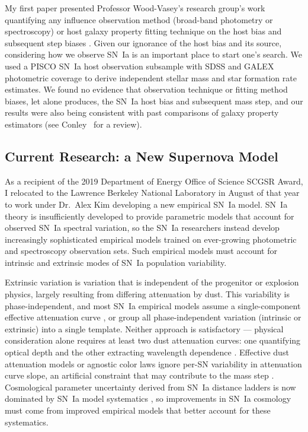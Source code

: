 \documentclass[modern]{aastex631}
\begin{document}
My first paper presented Professor Wood-Vasey's research group's work quantifying any influence observation method (broad-band photometry or spectroscopy) or host galaxy property fitting technique on the host bias and subsequent step biases \citep{Hand2022}. 
Given our ignorance of the host bias and its source, considering how we observe SN~Ia is an important place to start one's search. 
We used a PISCO SN~Ia host observation subsample \citep{Galbany2018} with SDSS and GALEX photometric coverage \citep{Alam2018,Morrissey2007} to derive independent stellar mass and star formation rate estimates. 
We found no evidence that observation technique or fitting method biases, let alone produces, the SN~Ia host bias and subsequent mass step, and our results were also being consistent with past comparisons of galaxy property estimators (see Conley~\citeyear{Conroy2013} for a review). 

\subsection{Current Research: a New Supernova Model}
As a recipient of the 2019 Department of Energy Office of Science SCGSR Award, I relocated to the Lawrence Berkeley National Laboratory in August of that year to work under Dr.\ Alex Kim developing a new empirical SN~Ia model. 
SN~Ia theory is insufficiently developed to provide parametric models that account for observed SN~Ia spectral variation, so the SN~Ia researchers instead develop increasingly sophisticated empirical models trained on ever-growing photometric and spectroscopy observation sets. 
Such empirical models must account for intrinsic and extrinsic modes of SN~Ia population variability. 

Extrinsic variation is variation that is independent of the progenitor or explosion physics, largely resulting from differing attenuation by dust.  
This variability is phase-independent, and most SN~Ia empirical models assume a single-component effective attenuation curve \citep{Jha2007,Burns2011,Mandel2022}, or group all phase-independent variation (intrinsic or extrinsic) into a single template\citep{Guy2007,Kenworthy2021}. 
Neither approach is satisfactory --- physical consideration alone requires at least two dust attenuation curves: one quantifying optical depth and the other extracting wavelength dependence \citep{Weingartner2001}. 
Effective dust attenuation models or agnostic color laws ignore per-SN variability in attenuation curve slope, an artificial constraint that may contribute to the mass step \citep{Brout2019,Popovic2021}. 
Cosmological parameter uncertainty derived from SN~Ia distance ladders is now dominated by SN~Ia model systematics \citep{Scolnic18}, so improvements in SN~Ia cosmology must come from improved empirical models that better account for these systematics. 
\end{document}
